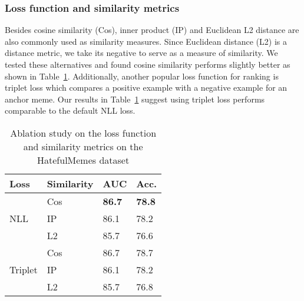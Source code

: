 \documentclass[11pt]{article}
\begin{document}
\subsubsection{Loss function and similarity metrics}
Besides cosine similarity (Cos), inner product (IP) and Euclidean L2 distance are also commonly used as similarity measures. Since Euclidean distance (L2) is a distance metric, we take its negative to serve as a measure of similarity. We tested these alternatives and found cosine similarity performs slightly better as shown in Table~\ref{tab:ablation_loss_sim}. Additionally, another popular loss function for ranking is triplet loss which compares a positive example with a negative example for an anchor meme. Our results in Table~\ref{tab:ablation_loss_sim} suggest using triplet loss performs comparable to the default NLL loss.
\begin{table}[]
\small
\caption{Ablation study on the loss function and similarity metrics on the HatefulMemes dataset}
\label{tab:ablation_loss_sim}
\centering
\begin{tabularx}{0.35\textwidth}{XXll}
\toprule
Loss & Similarity           & \textbf{AUC} & \textbf{Acc}.  \\ 
\midrule
\multirow{3}{*}{NLL} & Cos & \textbf{86.7} & \textbf{78.8} \\
 & IP & 86.1 & 78.2 \\
 & L2 & 85.7 & 76.6  \\
\midrule
\multirow{3}{*}{Triplet} & Cos & 86.7 & 78.7 \\
 & IP & 86.1 & 78.2 \\
 & L2 &  85.7 & 76.8 \\

\bottomrule
\end{tabularx}
\end{table}
\end{document}
